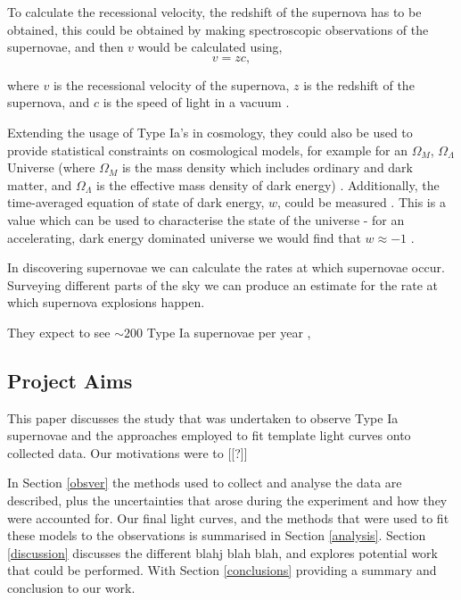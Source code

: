 \documentclass[twocolumn]{revtex4}
\begin{document}
To calculate the recessional velocity, the redshift of the supernova has to be obtained, this could be obtained by making spectroscopic observations of the supernovae, and then $v$ would be calculated using,
 \begin{equation}
v = zc,
\label{redshift}
\end{equation}

where $v$ is the recessional velocity of the supernova, $z$ is the redshift of the supernova, and $c$ is the speed of light in a vacuum \cite{mod_ast}.


Extending the usage of Type Ia's in cosmology, they could also be used to provide statistical constraints on cosmological models, for example for an $\Omega_M$, $\Omega_{\Lambda}$ Universe (where $\Omega_M$ is the mass density which includes ordinary and dark matter, and $\Omega_{\Lambda}$ is the effective mass density of dark energy) \cite{mod_ast, exp_uni_sn}. Additionally, the time-averaged equation of state of dark energy, $w$, could be measured \cite{sn_consts}. This is a value which can be used to characterise the state of the universe - for an accelerating, dark energy dominated universe we would find that $w \approx -1$ \cite{longair}. 

In discovering supernovae we can calculate the rates at which supernovae occur. Surveying different parts of the sky we can produce an estimate for the rate at which supernova explosions happen.

They expect to see $\sim 200$ Type Ia supernovae per year \cite{assasn-rev}, 

\vspace{-3ex}
\subsection{Project Aims}
\vspace{-2ex}
This paper discusses the study that was undertaken to observe Type Ia supernovae and the approaches employed to fit template light curves onto collected data. Our motivations were to [[?]]

In Section \ref{obsver} the methods used to collect and analyse the data are described, plus the uncertainties that arose during the experiment and how they were accounted for. Our final light curves, and the methods that were used to fit these models to the observations is summarised in Section \ref{analysis}. Section \ref{discussion} discusses the different blahj blah blah, and explores potential work that could be performed. With Section \ref{conclusions} providing a summary and conclusion to our work.
\end{document}
